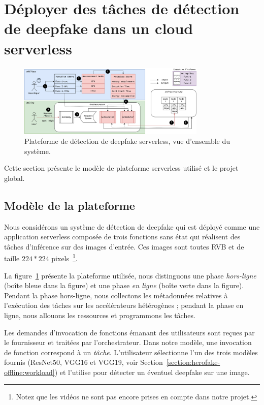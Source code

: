 \section{Déployer des tâches de détection de deepfake dans un cloud serverless}
\label{section:herofake-deepfake}

\begin{figure}[t]
\centering
\includegraphics[width=0.8\textwidth]{5_Chapitre3/figures/placement.png}
\caption{Plateforme de détection de deepfake serverless, vue d'ensemble du système.}
\label{figure:herofake-placement}
\end{figure}

Cette section présente le modèle de plateforme serverless utilisé et le projet global.

\subsection{Modèle de la plateforme}

Nous considérons un système de détection de deepfake qui est déployé comme une application serverless composée de trois fonctions sans état qui réalisent des tâches d'inférence sur des images d'entrée. Ces images sont toutes RVB et de taille $224 * 224$ pixels~\footnote{Notez que les vidéos ne sont pas encore prises en compte dans notre projet.}.

La figure~\ref{figure:herofake-placement} présente la plateforme utilisée, nous distinguons une phase \textit{hors-ligne} (boîte bleue dans la figure) et une phase \textit{en ligne} (boîte verte dans la figure). Pendant la phase hors-ligne, nous collectons les métadonnées relatives à l'exécution des tâches sur les accélérateurs hétérogènes ; pendant la phase en ligne, nous allouons les ressources et programmons les tâches.

Les demandes d'invocation de fonctions émanant des utilisateurs sont reçues par le fournisseur et traitées par l'orchestrateur. Dans notre modèle, une invocation de fonction correspond à un \textit{tâche}. L'utilisateur sélectionne l'un des trois modèles fournis (ResNet50, VGG16 et VGG19, voir Section~\ref{section:herofake-offline:workload}) et l'utilise pour détecter un éventuel deepfake sur une image.


